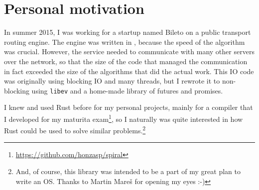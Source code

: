 \section{Personal motivation}

In summer 2015, I was working for a startup named Bileto on a public transport
routing engine. The engine was written in \Cplusplus, because the speed of the
algorithm was crucial. However, the service needed to communicate with many
other servers over the network, so that the size of the code that managed the
communication in fact exceeded the size of the algorithms that did the actual
work. This IO code was originally using blocking IO and many threads, but I
rewrote it to non-blocking using \texttt{libev} and a home-made library of
futures and promises.

I knew and used Rust before for my personal projects, mainly for a compiler that
I developed for my maturita
exam\footnote{\url{https://github.com/honzasp/spiral}}, so I naturally was quite
interested in how Rust could be used to solve similar problems.\footnote{And, of
course, this library was intended to be a part of my great plan to write an OS.
Thanks to Martin Mareš for opening my eyes :-)}
